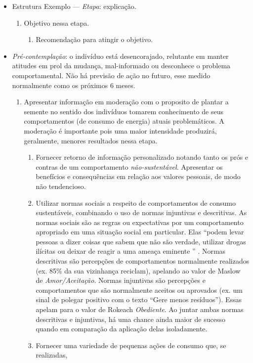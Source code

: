 \begin{itemize}
\item Estrutura Exemplo --- \emph{Etapa}: explicação.
\begin{enumerate}
\item Objetivo nessa etapa.
\begin{enumerate}
\item Recomendação para atingir o objetivo.
\end{enumerate}
\end{enumerate}
\item \emph{Pré-contemplação}: o indivíduo está desencorajado,
relutante em manter atitudes em prol da mudança, mal-informado ou
desconhece o problema comportamental. Não há previsão de ação no
futuro, esse medido normalmente como os próximos 6 meses.
\begin{enumerate}
\item Apresentar informação em moderação com o proposito de plantar a
semente no sentido dos indivíduos tomarem conhecimento de seus
comportamentos (de consumo de energia) atuais problemáticos. A
moderação é importante pois uma maior intensidade produzirá, geralmente,
menores resultados nessa etapa.
\begin{enumerate}
\item Fornecer retorno de informação personalizado notando tanto os
prós e contras de um comportamento \emph{não-sustentável}. Apresentar
os benefícios e consequências em relação aos valores pessoais, de modo
não tendencioso.
\item Utilizar normas sociais a respeito de comportamentos de consumo
sustentáveis, combinando o uso de normas injuntivas e descritivas. As
normas sociais são as regras ou expectativas por um comportamento
apropriado em uma situação social em particular. Elas ``podem levar
pessoas a dizer coisas que sabem que não são verdade, utilizar drogas
ilícitas ou deixar de reagir a uma ameaça eminente '' \cite[pp. 51,
tradução própria]{aceee_2010_estudos_feedback}.  Normas descritivas
são percepções de comportamentos normalmente realizados (ex. 85\% da
sua vizinhança reciclam), apelando ao valor de Maslow de
\emph{Amor/Aceitação}. Normas injuntivas são percepções e
comportamentos que são normalmente aceitos ou aprovados (ex. um sinal
de polegar positivo com o texto ``Gere menos resíduos''). Essas apelam
para o valor de Rokeach \emph{Obediente}.  Ao juntar ambas normas
descritivas e injuntivas, há uma chance ainda maior de sucesso quando
em comparação da aplicação delas isoladamente.
\item Fornecer uma variedade de pequenas ações de consumo que, se realizadas,

\end{enumerate}
\end{enumerate}
\end{itemize}
